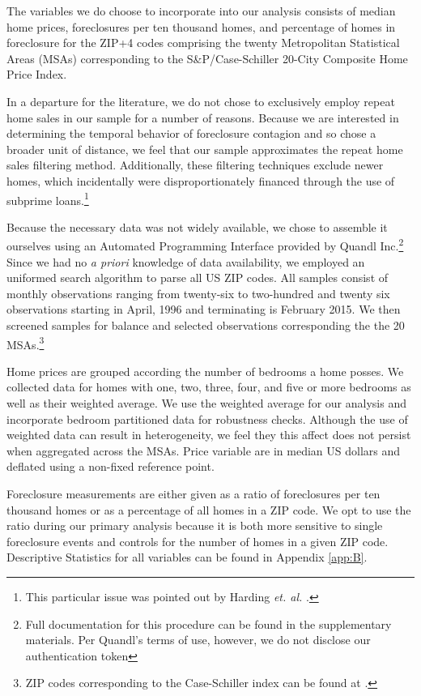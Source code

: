 \documentclass[12pt,oneside]{amsbook}
\newcommand{\et}{\textit{et. al. }}
\begin{document}
The variables we do choose to incorporate into our analysis consists of median home prices, foreclosures per ten thousand homes, and percentage of homes in foreclosure for the ZIP+4 codes comprising the twenty Metropolitan Statistical Areas (MSAs) corresponding to the S\&P/Case-Schiller 20-City Composite Home Price Index.

In a departure for the literature, we do not chose to exclusively employ repeat home sales in our sample for a number of reasons. Because we are interested in determining the temporal behavior of foreclosure contagion and so chose a broader unit of distance, we feel that our sample approximates the repeat home sales filtering method. Additionally, these filtering techniques exclude newer homes, which incidentally were disproportionately financed through the use of subprime loans.\footnote{This particular issue was pointed out by Harding \et \cite{Chi} . } 

Because the necessary data was not widely available, we chose to assemble it ourselves using an Automated Programming Interface provided by Quandl Inc.\footnote{Full documentation for this procedure can be found in the supplementary materials. Per Quandl's terms of use, however, we do not disclose our authentication token} Since we had no \textit{a priori} knowledge of data availability, we employed an uniformed search algorithm to parse all US ZIP codes. All samples consist of monthly observations ranging from twenty-six to two-hundred and twenty six observations starting in April, 1996 and terminating is February 2015. We then screened samples for balance and selected observations corresponding the the 20 MSAs.\footnote{ZIP codes corresponding to the Case-Schiller index can be found at \cite{Case}.}

Home prices are grouped according the number of bedrooms a home posses. We collected data for homes with one, two, three, four, and five or more bedrooms as well as their weighted average. We use the weighted average for our analysis and incorporate bedroom partitioned data for robustness checks. Although the use of weighted data can result in heterogeneity, we feel they this affect does not persist when aggregated across the MSAs. Price variable are in median US dollars and deflated using a non-fixed reference point. 

Foreclosure measurements are either given as a ratio of foreclosures per ten thousand homes or as a percentage of all homes in a ZIP code. We opt to use the ratio during our primary analysis because it is both more sensitive to single foreclosure events and controls for the number of homes in a given ZIP code. Descriptive Statistics for all variables can be found in Appendix \ref{app:B}. 
\end{document}
